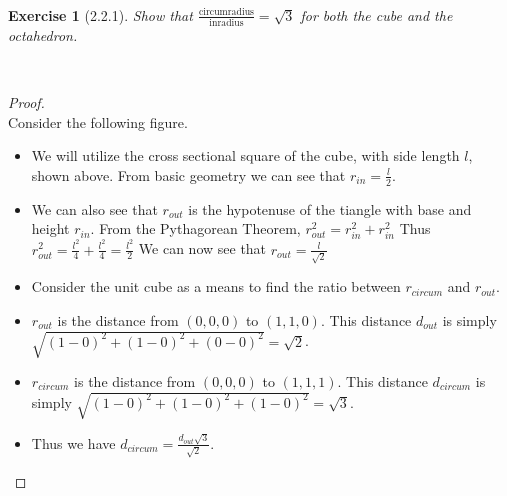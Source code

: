 \documentclass[12pt]{article}
\newcommand{\XB}{\color{black}}
\newcommand{\XBB}{\color{blue}}
\theoremstyle{plain}
\newtheorem{ex}{Exercise}
\begin{document}
\newpage
\XBB\hrulefill\XB \\
\begin{ex} [2.2.1]
  Show that $\displaystyle \frac{\text{circumradius}}{\text{inradius}}=\sqrt{3}$ for both the cube and the octahedron.
\end{ex}
\XBB\hrulefill\XB \\
\begin{proof}
  \ \\
  Consider the following figure. \\
  \begin{center}
  \end{center}
  \begin{itemize}
    \item We will utilize the cross sectional square of the cube, with side length $l$, shown above. 
    \subitem From basic geometry we can see that  $\displaystyle r_{in} = \frac{l}{2}$.
    \item We can also see that $r_{out}$ is the hypotenuse of the tiangle with base and height $r_{in}$.
    \subitem From the Pythagorean Theorem, $r_{out}^{2} = r_{in}^{2} + r_{in}^{2} $
    \subitem Thus $\displaystyle r_{out}^{2} = \frac{l^{2}}{4} + \frac{l^{2}}{4} = \frac{l^{2}}{2} $
    \subitem We can now see that $\displaystyle r_{out} = \frac{l}{\sqrt{2}}$
    \item Consider the unit cube as a means to find the ratio between $r_{circum}$ and $r_{out}$.
    \item $r_{out}$ is the distance from $(0,0,0)$ to $(1,1,0)$.
    \subitem This distance $d_{out}$ is simply $\sqrt{(1-0)^2 + (1-0)^2 + (0-0)^2} = \sqrt{2} $.
    \item $r_{circum}$ is the distance from $(0,0,0)$ to $(1,1,1)$.
    \subitem This distance $d_{circum}$ is simply $\sqrt{(1-0)^2 + (1-0)^2 + (1-0)^2} = \sqrt{3} $.  
    \item Thus we have $\displaystyle d_{circum} = \frac{d_{out}\sqrt{3}}{\sqrt{2}}$.

\end{itemize}
\end{proof}
\end{document}
